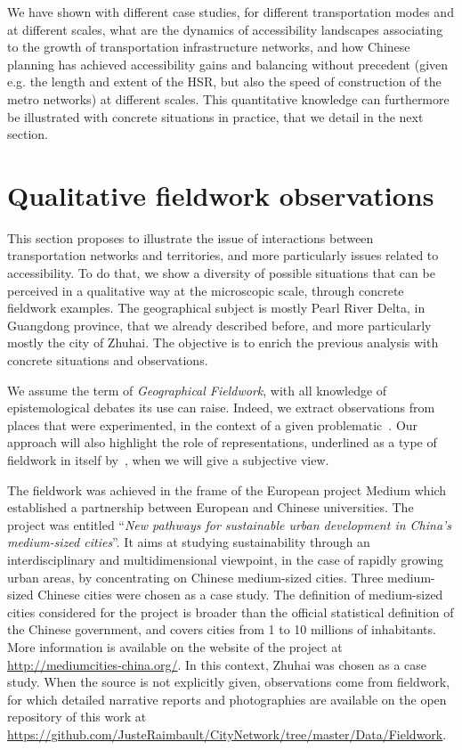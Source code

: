 We have shown with different case studies, for different transportation modes and at different scales, what are the dynamics of accessibility landscapes associating to the growth of transportation infrastructure networks, and how Chinese planning has achieved accessibility gains and balancing without precedent (given e.g. the length and extent of the HSR, but also the speed of construction of the metro networks) at different scales. This quantitative knowledge can furthermore be illustrated with concrete situations in practice, that we detail in the next section.


\section{Qualitative fieldwork observations}


This section proposes to illustrate the issue of interactions between transportation networks and territories, and more particularly issues related to accessibility. To do that, we show a diversity of possible situations that can be perceived in a qualitative way at the microscopic scale, through concrete fieldwork examples. The geographical subject is mostly Pearl River Delta, in Guangdong province, that we already described before, and more particularly mostly the city of Zhuhai. The objective is to enrich the previous analysis with concrete situations and observations.


We assume the term of \emph{Geographical Fieldwork}, with all knowledge of epistemological debates its use can raise. Indeed, we extract observations from places that were experimented, in the context of a given problematic~\citep{retaille2010terrain}. Our approach will also highlight the role of representations, underlined as a type of fieldwork in itself by~\cite{lefort2012terrain}, when we will give a subjective view.

The fieldwork was achieved in the frame of the European project Medium which established a partnership between European and Chinese universities. The project was entitled ``\textit{New pathways for sustainable urban development in China’s medium-sized cities}''. It aims at studying sustainability through an interdisciplinary and multidimensional viewpoint, in the case of rapidly growing urban areas, by concentrating on Chinese medium-sized cities. Three medium-sized Chinese cities were chosen as a case study. The definition of medium-sized cities considered for the project is broader than the official statistical definition of the Chinese government, and covers cities from 1 to 10 millions of inhabitants. More information is available on the website of the project at \url{http://mediumcities-china.org/}. In this context, Zhuhai was chosen as a case study. When the source is not explicitly given, observations come from fieldwork, for which detailed narrative reports and photographies are available on the open repository of this work at \url{https://github.com/JusteRaimbault/CityNetwork/tree/master/Data/Fieldwork}.

